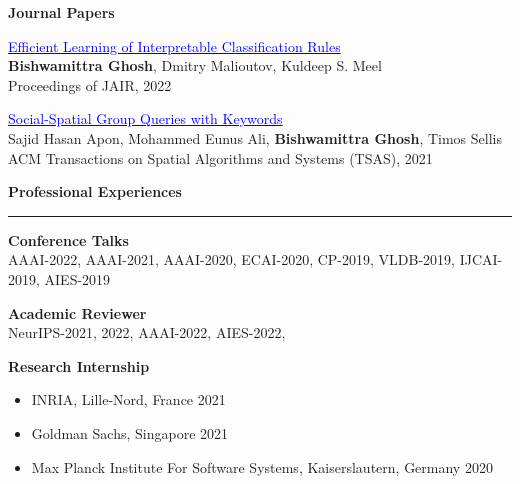 \documentclass[a4paper,10pt,final]{article}
\newcommand{\Sep}{\vspace{1.5em}}
\newcommand{\SmallSep}{\vspace{0.5em}}
\newcommand{\blue}[1]{\textcolor{blue}{#1}}
\begin{document}
\clearpage
\large { \textbf{Journal Papers}}
\normalsize

\SmallSep

	\begin{etaremune}
		\item \href{https://arxiv.org/pdf/2205.06936.pdf}{\blue{Efficient Learning of Interpretable Classification Rules}} \\
		\textbf{Bishwamittra Ghosh}, Dmitry Malioutov, Kuldeep S. Meel\\
		Proceedings of JAIR, 2022
		
		
		\item 	\href{https://dl.acm.org/doi/full/10.1145/3475962?accessTab=true}{\blue{Social-Spatial Group Queries with Keywords}}\\
		Sajid Hasan Apon, Mohammed Eunus Ali, \textbf{Bishwamittra Ghosh}, Timos Sellis\\
		ACM Transactions on Spatial Algorithms and Systems (TSAS), 2021
		
	\end{etaremune}

%

\Sep
\Large { \textbf{Professional Experiences}}\\
\noindent\rule{\textwidth}{1pt}
\normalsize
\textbf{Conference Talks}\\
AAAI-2022, AAAI-2021, AAAI-2020, ECAI-2020, CP-2019, VLDB-2019, IJCAI-2019, AIES-2019

\SmallSep
\textbf{Academic Reviewer}\\
NeurIPS-2021, 2022, AAAI-2022,  AIES-2022, 

\SmallSep
\textbf{Research Internship}
\begin{itemize}
	\item INRIA, Lille-Nord, France \hspace*{\fill}2021
	\item Goldman Sachs, Singapore \hspace*{\fill}2021
	\item  Max Planck Institute For Software Systems, Kaiserslautern, Germany \hspace*{\fill}2020
\end{itemize}
\end{document}
